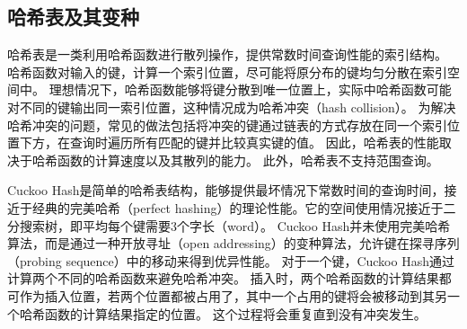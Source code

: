 \subsection{哈希表及其变种}

哈希表是一类利用哈希函数进行散列操作，提供常数时间查询性能的索引结构。
哈希函数对输入的键，计算一个索引位置，尽可能将原分布的键均匀分散在索引空间中。
理想情况下，哈希函数能够将键分散到唯一位置上，实际中哈希函数可能对不同的键输出同一索引位置，这种情况成为哈希冲突（hash collision）。
为解决哈希冲突的问题，常见的做法包括将冲突的键通过链表的方式存放在同一个索引位置下方，在查询时遍历所有匹配的键并比较真实键的值。
因此，哈希表的性能取决于哈希函数的计算速度以及其散列的能力。
此外，哈希表不支持范围查询。


Cuckoo Hash\cite{pagh2004cuckoo}是简单的哈希表结构，能够提供最坏情况下常数时间的查询时间，接近于经典的完美哈希\cite{botelho2005practical, lu2006perfect}（perfect hashing）的理论性能。它的空间使用情况接近于二分搜索树，即平均每个键需要3个字长（word）。
Cuckoo Hash并未使用完美哈希算法，而是通过一种开放寻址（open addressing）的变种算法，允许键在探寻序列（probing sequence）中的移动来得到优异性能。
对于一个键，Cuckoo Hash通过计算两个不同的哈希函数来避免哈希冲突。
插入时，两个哈希函数的计算结果都可作为插入位置，若两个位置都被占用了，其中一个占用的键将会被移动到其另一个哈希函数的计算结果指定的位置。
这个过程将会重复直到没有冲突发生。

